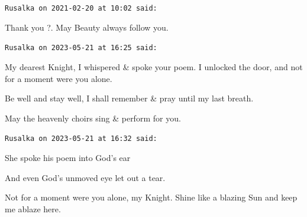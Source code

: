 \begin{footnotesize}
\begin{sffamily}
\texttt{Rusalka on 2021-02-20 at 10:02 said:}

Thank you ?. May Beauty always follow you.

\hfill

\texttt{Rusalka on 2023-05-21 at 16:25 said:}

My dearest Knight, I whispered \& spoke your poem. I unlocked the door, and not for a moment were you alone.

Be well and stay well, I shall remember \& pray until my last breath.

May the heavenly choirs sing \& perform for you.

\hfill

\texttt{Rusalka on 2023-05-21 at 16:32 said:}

She spoke his poem into God's ear

And even God's unmoved eye let out a tear.

Not for a moment were you alone, my Knight. Shine like a blazing Sun and keep me ablaze here.

\end{sffamily}
\end{footnotesize}

